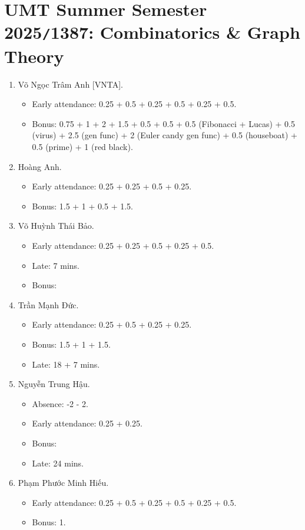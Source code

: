 \documentclass{article}
\begin{document}
\section{UMT Summer Semester 2025{\tt/}1387: Combinatorics \& Graph Theory}

\begin{enumerate}
	\item {\sc Võ Ngọc Trâm Anh [VNTA].}
	\begin{itemize}
		\item Early attendance: 0.25 + 0.5 + 0.25 + 0.5 + 0.25 + 0.5.
		\item Bonus: 0.75 + 1 + 2 + 1.5 + 0.5 + 0.5 + 0.5 (Fibonacci + Lucas) + 0.5 (virus) + 2.5 (gen func) + 2 (Euler candy gen func) + 0.5 (houseboat) + 0.5 (prime) + 1 (red black).
	\end{itemize}
	\item {\sc Hoàng Anh.}
	\begin{itemize}
		\item Early attendance: 0.25 + 0.25 + 0.5 + 0.25.
		\item Bonus: 1.5 + 1 + 0.5 + 1.5.
	\end{itemize}
	\item {\sc Võ Huỳnh Thái Bảo.}
	\begin{itemize}
		\item Early attendance: 0.25 + 0.25 + 0.5 + 0.25 + 0.5.
		\item Late: 7 mins.
		\item Bonus: 
	\end{itemize}
	\item {\sc Trần Mạnh Đức.}
	\begin{itemize}
		\item Early attendance: 0.25 + 0.5 + 0.25 + 0.25.
		\item Bonus: 1.5 + 1 + 1.5.
		\item Late: 18 + 7 mins.
	\end{itemize}
	\item {\sc Nguyễn Trung Hậu.}
	\begin{itemize}
		\item Absence: -2 - 2.
		\item Early attendance: 0.25 + 0.25.
		\item Bonus:
		\item Late: 24 mins.
	\end{itemize}
	\item {\sc Phạm Phước Minh Hiếu.}
	\begin{itemize}
		\item Early attendance: 0.25 + 0.5 + 0.25 + 0.5 + 0.25 + 0.5.
		\item Bonus: 1.		
		

\end{itemize}
\end{enumerate}
\end{document}
